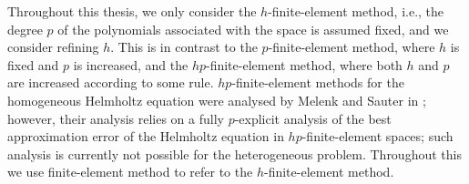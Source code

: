 



Throughout this thesis, we only consider the $h$-finite-element method, i.e., the degree $p$ of the polynomials associated with the space is assumed fixed, and we consider refining $h.$ This is in contrast to the $p$-finite-element method, where $h$ is fixed and $p$ is increased, and the $hp$-finite-element method, where both $h$ and $p$ are increased according to some rule. $hp$-finite-element methods for the homogeneous Helmholtz equation were analysed by Melenk and Sauter in \cite{MeSa:10,MeSa:11}; however, their analysis relies on a fully $p$-explicit analysis of the best approximation error of the Helmholtz equation in $hp$-finite-element spaces; such analysis is currently not possible for the heterogeneous problem. Throughout this  we use finite-element method to refer to the $h$-finite-element method.


